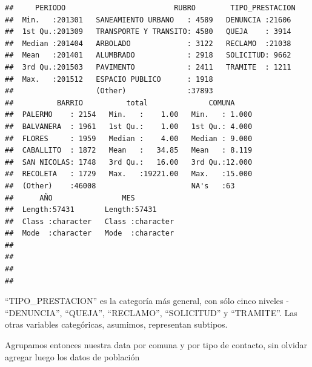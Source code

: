\documentclass[]{book}
\newenvironment{Shaded}{\begin{snugshade}}{\end{snugshade}}
\newcommand{\KeywordTok}[1]{\textcolor[rgb]{0.13,0.29,0.53}{\textbf{#1}}}
\newcommand{\DataTypeTok}[1]{\textcolor[rgb]{0.13,0.29,0.53}{#1}}
\newcommand{\DecValTok}[1]{\textcolor[rgb]{0.00,0.00,0.81}{#1}}
\newcommand{\StringTok}[1]{\textcolor[rgb]{0.31,0.60,0.02}{#1}}
\newcommand{\OperatorTok}[1]{\textcolor[rgb]{0.81,0.36,0.00}{\textbf{#1}}}
\newcommand{\NormalTok}[1]{#1}
\begin{document}
\begin{verbatim}
##     PERIODO                         RUBRO        TIPO_PRESTACION 
##  Min.   :201301   SANEAMIENTO URBANO   : 4589   DENUNCIA :21606  
##  1st Qu.:201309   TRANSPORTE Y TRANSITO: 4580   QUEJA    : 3914  
##  Median :201404   ARBOLADO             : 3122   RECLAMO  :21038  
##  Mean   :201401   ALUMBRADO            : 2918   SOLICITUD: 9662  
##  3rd Qu.:201503   PAVIMENTO            : 2411   TRAMITE  : 1211  
##  Max.   :201512   ESPACIO PUBLICO      : 1918                    
##                   (Other)              :37893                    
##          BARRIO          total              COMUNA      
##  PALERMO    : 2154   Min.   :    1.00   Min.   : 1.000  
##  BALVANERA  : 1961   1st Qu.:    1.00   1st Qu.: 4.000  
##  FLORES     : 1959   Median :    4.00   Median : 9.000  
##  CABALLITO  : 1872   Mean   :   34.85   Mean   : 8.119  
##  SAN NICOLAS: 1748   3rd Qu.:   16.00   3rd Qu.:12.000  
##  RECOLETA   : 1729   Max.   :19221.00   Max.   :15.000  
##  (Other)    :46008                      NA's   :63      
##      AÑO                MES           
##  Length:57431       Length:57431      
##  Class :character   Class :character  
##  Mode  :character   Mode  :character  
##                                       
##                                       
##                                       
## 
\end{verbatim}

``TIPO\_PRESTACION'' es la categoría más general, con sólo cinco niveles
- ``DENUNCIA'', ``QUEJA'', ``RECLAMO'', ``SOLICITUD'' y ``TRAMITE''. Las
otras variables categóricas, asumimos, representan subtipos.

Agrupamos entonces nuestra data por comuna y por tipo de contacto, sin
olvidar agregar luego los datos de población

\begin{Shaded}
\end{Shaded}
\end{document}
